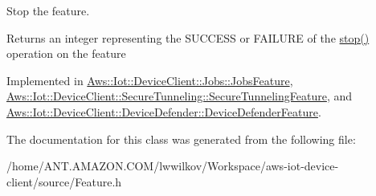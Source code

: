 Stop the feature. 

\begin{DoxyReturn}{Returns}
an integer representing the S\+U\+C\+C\+E\+SS or F\+A\+I\+L\+U\+RE of the \hyperlink{class_aws_1_1_iot_1_1_device_client_1_1_feature_a5b672f7b1403512cad9104ba923fc73d}{stop()} operation on the feature 
\end{DoxyReturn}


Implemented in \hyperlink{class_aws_1_1_iot_1_1_device_client_1_1_jobs_1_1_jobs_feature_aeec6332d60872b2a4471f6494f93b1c4}{Aws\+::\+Iot\+::\+Device\+Client\+::\+Jobs\+::\+Jobs\+Feature}, \hyperlink{class_aws_1_1_iot_1_1_device_client_1_1_secure_tunneling_1_1_secure_tunneling_feature_a9cd3840b50bd1f62537df3354c7d2fbf}{Aws\+::\+Iot\+::\+Device\+Client\+::\+Secure\+Tunneling\+::\+Secure\+Tunneling\+Feature}, and \hyperlink{class_aws_1_1_iot_1_1_device_client_1_1_device_defender_1_1_device_defender_feature_a93b78c0fe8518baabdff3d38544b9d00}{Aws\+::\+Iot\+::\+Device\+Client\+::\+Device\+Defender\+::\+Device\+Defender\+Feature}.



The documentation for this class was generated from the following file\+:\begin{DoxyCompactItemize}
\item 
/home/\+A\+N\+T.\+A\+M\+A\+Z\+O\+N.\+C\+O\+M/lwwilkov/\+Workspace/aws-\/iot-\/device-\/client/source/Feature.\+h\end{DoxyCompactItemize}
